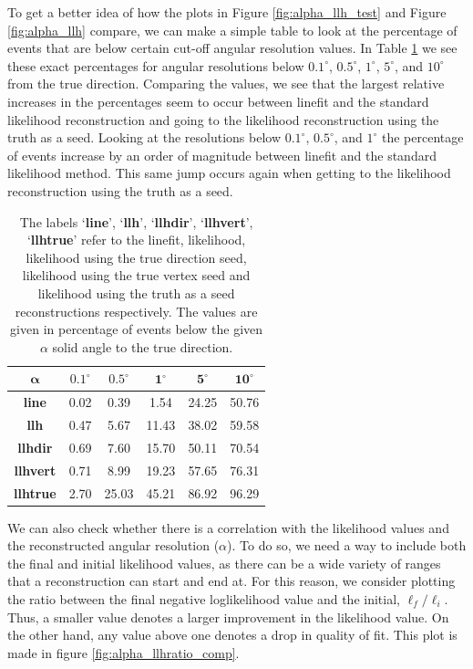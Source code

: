 To get a better idea of how the plots in Figure \ref{fig:alpha_llh_test} and Figure \ref{fig:alpha_llh} compare, we can make a simple table to look at the percentage of events that are below certain cut-off angular resolution values. In Table \ref{tab:alpha_comp} we see these exact percentages for angular resolutions below $0.1^{\circ}$, $0.5^{\circ}$, $1^{\circ}$, $5^{\circ}$, and $10^{\circ}$ from the true direction. Comparing the values, we see that the largest relative increases in the percentages seem to occur between linefit and the standard likelihood reconstruction and going to the likelihood reconstruction using the truth as a seed. Looking at the resolutions below $0.1^{\circ}$, $0.5^{\circ}$, and $1^{\circ}$ the percentage of events increase by an order of magnitude between linefit and the standard likelihood method. This same jump occurs again when getting to the likelihood reconstruction using the truth as a seed. 

\begin{table}[H]
  \centering
  \begin{tabular}{|c|c|c|c|c|c|} 
    \hline
    $\mathbf{\alpha}$ & $\mathbf{0.1^{\circ}}$ & $\mathbf{0.5^{\circ}}$ & $\mathbf{1^{\circ}}$ & $\mathbf{5^{\circ}}$ & $\mathbf{10^{\circ}}$ \\
    \hline
    \textbf{line} & 0.02 & 0.39 & 1.54 & 24.25 & 50.76 \\
    \hline
    \textbf{llh} & 0.47 & 5.67 & 11.43 & 38.02 & 59.58 \\
    \hline
    \textbf{llhdir} & 0.69 & 7.60 & 15.70 & 50.11 & 70.54 \\
    \hline
    \textbf{llhvert} & 0.71 & 8.99 & 19.23 & 57.65 & 76.31 \\
    \hline
    \textbf{llhtrue} & 2.70 & 25.03 & 45.21 & 86.92 & 96.29 \\
    \hline
  \end{tabular}
  \caption{The labels `\textbf{line}', `\textbf{llh}', `\textbf{llhdir}', `\textbf{llhvert}', `\textbf{llhtrue}' refer to the linefit, likelihood, likelihood using the true direction seed, likelihood using the true vertex seed and likelihood using the truth as a seed reconstructions respectively. The values are given in percentage of events below the given $\alpha$ solid angle to the true direction.} 
  \label{tab:alpha_comp}
\end{table}

We can also check whether there is a correlation with the likelihood values and the reconstructed angular resolution ($\alpha$). To do so, we need a way to include both the final and initial likelihood values, as there can be a wide variety of ranges that a reconstruction can start and end at. For this reason, we consider plotting the ratio between the final negative loglikelihood value and the initial, $\ell_{f}/\ell_{i}$. Thus, a smaller value denotes a larger improvement in the likelihood value. On the other hand, any value above one denotes a drop in quality of fit. This plot is made in figure \ref{fig:alpha_llhratio_comp}.

